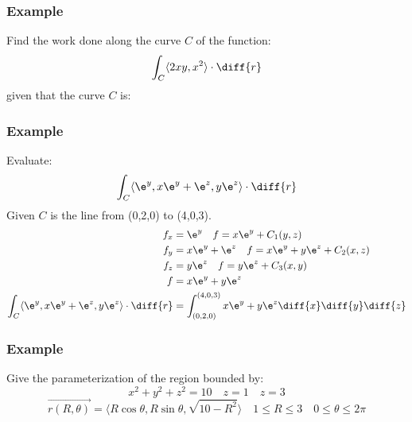 \documentclass{math}
\begin{document}
\subsubsection*{Example}
Find the work done along the curve \( C \) of the function:
\[ \int_{C}\langle2xy,x^2\rangle\cdot\diff{r} \]
given that the curve \( C \) is:
\begin{center}
\end{center}

\subsubsection*{Example}
Evaluate:
\[ \int_{C}\langle\e^y,x\e^y+\e^z,y\e^z\rangle\cdot\diff{r} \]
Given \( C \) is the line from (0,2,0) to (4,0,3).
\begin{align*}
  f_x &= \e^y \quad f = x\e^y+C_1(y,z) \\
  f_y &= x\e^y+\e^z \quad f = x\e^y+y\e^z+C_2(x,z) \\
  f_z &= y\e^z \quad f = y\e^z+C_3(x,y) \\
  f &= x\e^y+y\e^z \\
  \int_{C}\langle\e^y,x\e^y+\e^z,y\e^z\rangle\cdot\diff{r} &=
    \int_{(0,2,0)}^{(4,0,3)}x\e^y+y\e^z\diff{x}\diff{y}\diff{z}
\end{align*}

\subsubsection*{Example}
Give the parameterization of the region bounded by:
\[ x^2+y^2+z^2 = 10 \quad z = 1 \quad z = 3 \]
\[ \overrightarrow{r(R,\theta)} =
  \langle R\cos\theta,R\sin\theta,\sqrt{10-R^2}\rangle \quad
  1\le R\le 3 \quad 0\le\theta\le2\pi \]
\end{document}
